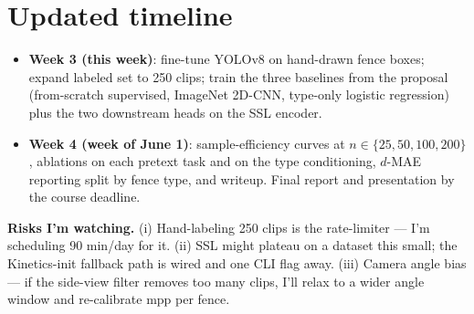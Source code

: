 \documentclass[10pt]{article}
\begin{document}
\section{Updated timeline}

\begin{itemize}
\item \textbf{Week 3 (this week)}: fine-tune YOLOv8 on hand-drawn fence boxes;
  expand labeled set to 250 clips; train the three baselines from the proposal
  (from-scratch supervised, ImageNet 2D-CNN, type-only logistic regression) plus
  the two downstream heads on the SSL encoder.
\item \textbf{Week 4 (week of June 1)}: sample-efficiency curves at $n \in
  \{25, 50, 100, 200\}$, ablations on each pretext task and on the type
  conditioning, $d$-MAE reporting split by fence type, and writeup. Final
  report and presentation by the course deadline.
\end{itemize}

\textbf{Risks I'm watching.} (i) Hand-labeling 250 clips is the rate-limiter
--- I'm scheduling 90 min/day for it. (ii) SSL might plateau on a dataset this
small; the Kinetics-init fallback path is wired and one CLI flag away.
(iii) Camera angle bias --- if the side-view filter removes too many clips,
I'll relax to a wider angle window and re-calibrate mpp per fence.
\end{document}

